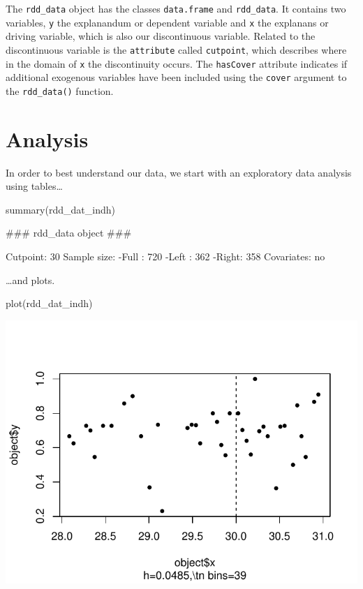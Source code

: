 \documentclass[article]{jss}
\begin{document}
The \texttt{rdd\_data} object has the classes \texttt{data.frame} and
\texttt{rdd\_data}. It contains two variables, \texttt{y} the
explanandum or dependent variable and \texttt{x} the explanans or
driving variable, which is also our discontinuous variable. Related to
the discontinuous variable is the \texttt{attribute} called
\texttt{cutpoint}, which describes where in the domain of \texttt{x} the
discontinuity occurs. The \texttt{hasCover} attribute indicates if
additional exogenous variables have been included using the
\texttt{cover} argument to the \texttt{rdd\_data()} function.

\section{Analysis}\label{analysis}

In order to best understand our data, we start with an exploratory data
analysis using tables\ldots{}

\begin{CodeChunk}
\begin{CodeInput}
summary(rdd_dat_indh)
\end{CodeInput}
\begin{CodeOutput}
### rdd_data object ###

Cutpoint: 30 
Sample size: 
    -Full : 720 
    -Left : 362 
    -Right: 358
Covariates: no 
\end{CodeOutput}
\end{CodeChunk}

\ldots{}and plots.

\begin{CodeChunk}
\begin{CodeInput}
plot(rdd_dat_indh)
\end{CodeInput}


\begin{center}\includegraphics{README_files/figure-latex/plot-1} \end{center}

\end{CodeChunk}
\end{document}
